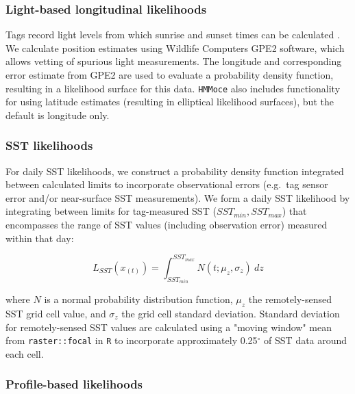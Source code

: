 \subsubsection{Light-based longitudinal
likelihoods}%

Tags record light levels from which sunrise and sunset times can be calculated \citep{Hill2001}. We calculate position estimates using Wildlife Computers GPE2 software, which allows vetting of spurious light measurements. The longitude and corresponding error estimate from GPE2 are used to evaluate a probability density function, resulting in a likelihood surface for this data. \texttt{HMMoce} also includes functionality for using latitude estimates (resulting in elliptical likelihood surfaces), but the default is longitude only.

\subsubsection{SST likelihoods}

For daily SST likelihoods, we construct a probability density function integrated between calculated limits \citep{LeBris2013a} to incorporate observational errors (e.g.~tag sensor error and/or near-surface SST measurements). We form a daily SST likelihood by integrating between limits for tag-measured SST ($SST_{min},SST_{max}$) that encompasses the range of SST values (including observation error) measured within that day:

\begin{equation}
L_{SST}(x_{(t)}) = \int_{SST_{min}}^{SST_{max}} N(t; \mu_z, \sigma_z)~dz
\label{eq:a1e2}
\end{equation}

where $N$ is a normal probability distribution function, $\mu_z$ the remotely-sensed SST grid cell value, and $\sigma_z$ the grid cell standard deviation. Standard deviation for remotely-sensed SST values are calculated using a "moving window" mean from \texttt{raster::focal} in \texttt{R} to incorporate approximately 0.25$^{\circ}$ of SST data around each cell.

\subsubsection{Profile-based
likelihoods}

